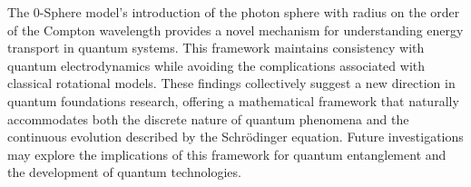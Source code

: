 \documentclass[%
 reprint,
 amsmath,amssymb,
 aps,
]{revtex4-1}
\numberwithin{equation}{section}%
\begin{document}
The 0-Sphere model's introduction of the photon sphere with radius on the order of the Compton wavelength provides a novel mechanism for understanding energy transport in quantum systems. This framework maintains consistency with quantum electrodynamics while avoiding the complications associated with classical rotational models. These findings collectively suggest a new direction in quantum foundations research, offering a mathematical framework that naturally accommodates both the discrete nature of quantum phenomena and the continuous evolution described by the Schrödinger equation. Future investigations may explore the implications of this framework for quantum entanglement and the development of quantum technologies.



\end{document}
